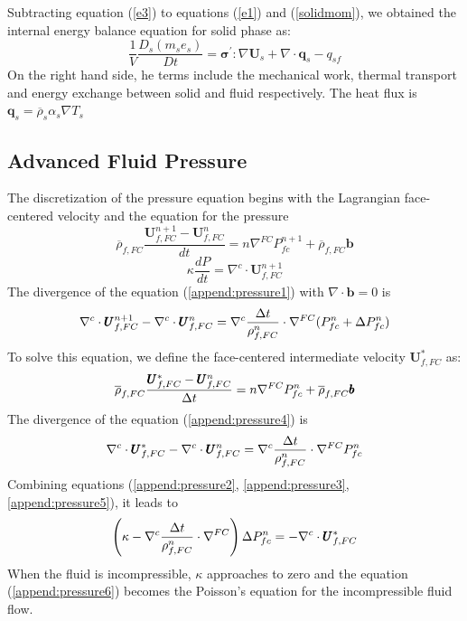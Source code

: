 \documentclass[preprint,12pt]{elsarticle}
\begin{document}
%
%
Subtracting equation (\ref{e3}) to equations (\ref{e1}) and (\ref{solidmom}), we obtained the internal energy balance equation for solid phase as:
%
%
\begin{equation}
     \frac{1}{V}\frac{D_s(m_s e_s)}{Dt} = \pmb{\sigma}^\prime:\nabla \pmb{U}_s
    + \nabla \cdot \pmb{q}_s - q_{sf} 
\end{equation}
%
%
On the right hand side, he terms include the mechanical work, thermal transport and energy exchange between solid and fluid respectively. The heat flux is $\pmb{q}_s = \overline{\rho}_s \alpha_s \nabla T_s$
%
%
\subsection{\textsf{Advanced Fluid Pressure}}
The discretization of the pressure equation begins with the Lagrangian face-centered velocity and the equation for the pressure
%
\begin{equation}
 \label{append:pressure1}
  \overline{\rho}_{f,FC} \frac{\pmb{U}_{f,FC}^{n+1} - \pmb{U}_{f,FC}^{n}}{dt} 
  = n \nabla^{FC} P_{fc}^{n+1} + \overline{\rho}_{f,FC} \pmb{b}
\end{equation}
%
%
\begin{equation}
\label{append:pressure2}
  \kappa \frac{dP}{dt} = \nabla^c \cdot \pmb{U}_{f,FC}^{n+1}
\end{equation}
%
The divergence of the equation (\ref{append:pressure1}) with $ \nabla \cdot \pmb{b} = 0$ is
%
\begin{equation}
\label{append:pressure3}
  \nabla^c \cdot \pmb{U}_{f,FC}^{n+1} - \nabla^c \cdot \pmb{U}_{f,FC}^{n}
  = \nabla^c \frac{\Delta{t}}{\rho_{f,FC}^n} \cdot \nabla^{FC} (P_{fc}^{n} + \Delta P_{fc}^{n})
\end{equation}
%
To solve this equation, we define the face-centered intermediate velocity $ \pmb{U}_{f,FC}^{*}$ as:
%
\begin{equation}
 \label{append:pressure4}
  \overline{\rho}_{f,FC} \frac{\pmb{U}_{f,FC}^{*} - \pmb{U}_{f,FC}^{n}}{\Delta{t}} 
  = n \nabla^{FC} P_{fc}^{n} + \overline{\rho}_{f,FC} \pmb{b}
\end{equation}
%
%
The divergence of the equation (\ref{append:pressure4}) is
%
\begin{equation}
\label{append:pressure5}
  \nabla^c \cdot \pmb{U}_{f,FC}^{*} - \nabla^c \cdot \pmb{U}_{f,FC}^{n}
  = \nabla^c \frac{\Delta{t}}{\rho_{f,FC}^n} \cdot \nabla^{FC} P_{fc}^{n}
\end{equation}
%
Combining equations (\ref{append:pressure2}, \ref{append:pressure3}, \ref{append:pressure5}), it leads to
\begin{equation}
\label{append:pressure6}
  \left(  
   \kappa - \nabla^c \frac{\Delta{t}}{\rho_{f,FC}^n} \cdot \nabla^{FC}
  \right) \Delta P_{fc}^{n} = - \nabla^c \cdot \pmb{U}_{f,FC}^{*}
\end{equation}
When the fluid is incompressible, $\kappa$ approaches to zero and the equation (\ref{append:pressure6}) becomes the Poisson's equation for the incompressible fluid flow.
%
%
\end{document}
